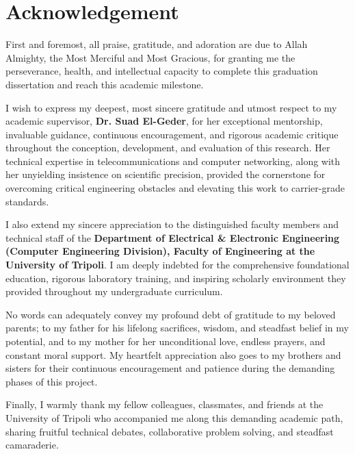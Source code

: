 \documentclass[12pt,a4paper,oneside]{report}
\begin{document}
\clearpage

\chapter*{Acknowledgement}

First and foremost, all praise, gratitude, and adoration are due to Allah Almighty, the Most Merciful and Most Gracious, for granting me the perseverance, health, and intellectual capacity to complete this graduation dissertation and reach this academic milestone.

I wish to express my deepest, most sincere gratitude and utmost respect to my academic supervisor, \textbf{Dr. Suad El-Geder}, for her exceptional mentorship, invaluable guidance, continuous encouragement, and rigorous academic critique throughout the conception, development, and evaluation of this research. Her technical expertise in telecommunications and computer networking, along with her unyielding insistence on scientific precision, provided the cornerstone for overcoming critical engineering obstacles and elevating this work to carrier-grade standards.

I also extend my sincere appreciation to the distinguished faculty members and technical staff of the \textbf{Department of Electrical \& Electronic Engineering (Computer Engineering Division), Faculty of Engineering at the University of Tripoli}. I am deeply indebted for the comprehensive foundational education, rigorous laboratory training, and inspiring scholarly environment they provided throughout my undergraduate curriculum.

No words can adequately convey my profound debt of gratitude to my beloved parents; to my father for his lifelong sacrifices, wisdom, and steadfast belief in my potential, and to my mother for her unconditional love, endless prayers, and constant moral support. My heartfelt appreciation also goes to my brothers and sisters for their continuous encouragement and patience during the demanding phases of this project.

Finally, I warmly thank my fellow colleagues, classmates, and friends at the University of Tripoli who accompanied me along this demanding academic path, sharing fruitful technical debates, collaborative problem solving, and steadfast camaraderie.
\end{document}
